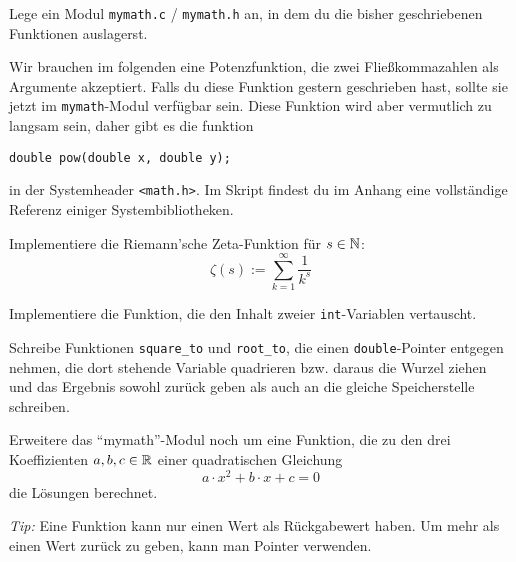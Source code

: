 \documentclass{uebungszettel}
\begin{document}
\newcommand{\ah}[2]{\ \\* \emph{(#1, #2)}\\}
\newcommand{\power}{\mathrm{power}}



\begin{aufg} Lege ein Modul \verb|mymath.c| / \verb|mymath.h| an, in dem du die bisher geschriebenen Funktionen auslagerst.
\end{aufg}

 Wir brauchen im folgenden eine Potenzfunktion, die zwei Fließkommazahlen als Argumente akzeptiert. Falls du diese Funktion gestern geschrieben hast, sollte sie jetzt im \verb|mymath|-Modul verfügbar sein. Diese Funktion wird aber vermutlich zu langsam sein, daher gibt es die funktion 

\begin{verbatim}
double pow(double x, double y);
\end{verbatim}

in der Systemheader \verb|<math.h>|. Im Skript findest du im Anhang eine vollständige Referenz einiger Systembibliotheken.


\begin{aufg}
Implementiere die Riemann'sche Zeta-Funktion für $s \in \mathbb{N}$: $$
\zeta(s) := \sum_{k=1}^\infty \frac{1}{k^s} $$
\end{aufg}

\begin{aufg}
Implementiere die Funktion, die den Inhalt zweier \verb|int|-Variablen vertauscht.
\end{aufg}

\begin{aufg}
Schreibe Funktionen \verb|square_to| und \verb|root_to|, die einen \verb|double|-Pointer entgegen nehmen, die dort stehende Variable quadrieren bzw. daraus die Wurzel ziehen und das Ergebnis sowohl zurück geben als auch an die gleiche Speicherstelle schreiben.
\end{aufg}

\begin{aufg}
Erweitere das "`mymath"'-Modul noch um eine Funktion, die zu den drei Koeffizienten $a, b, c \in \mathbb{R}$ einer quadratischen Gleichung $$
a \cdot x^2 + b \cdot x + c = 0 $$
die Lösungen berechnet.

\medskip \noindent \emph{Tip:} Eine Funktion kann nur einen Wert als Rückgabewert haben. Um mehr als einen Wert zurück zu geben, kann man Pointer verwenden.
\end{aufg}
\end{document}
